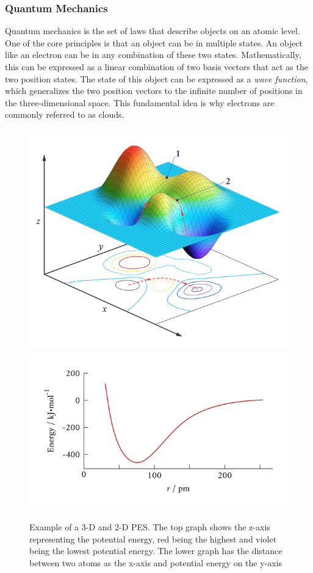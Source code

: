 \documentclass[12pt, abstract = true]{scrartcl}
\begin{document}
\subsubsection{Quantum Mechanics}
Quantum mechanics is the set of laws that describe objects on an atomic level. One of the core
principles is that an object can be in multiple states. An object like an electron can be in any 
combination of these two states. Mathematically, this can be expressed as a linear combination of 
two basis vectors that act as the two position states. The state of this object can be expressed 
as a \emph{wave function}, which generalizes the two position vectors to the infinite number of 
positions in the three-dimensional space. This fundamental idea is why electrons are commonly 
referred to as clouds.

\begin{figure}
  \centering
  \includegraphics[scale=.4]{pes.png}
  \includegraphics[scale=.4]{pes2.png}
  
  \caption{Example of a 3-D and 2-D PES. The top graph shows the z-axis representing the potential energy, red being the highest and violet being the lowest potential energy. The lower graph has the distance between two atoms as the x-axis and potential energy on the y-axis}\label{fig:pes}
\end{figure}
\end{document}

